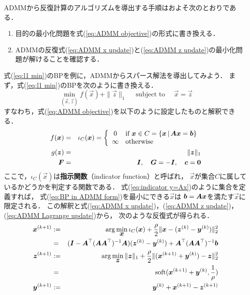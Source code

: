 ADMMから反復計算のアルゴリズムを導出する手順はおよそ次のとおりである．
\begin{enumerate}
\item 目的の最小化問題を式(\ref{eq:ADMM objective})の形式に書き換える．
\item ADMMの反復式(\ref{eq:ADMM x update})と(\ref{eq:ADMM z update})の最小化問題が解けることを確認する．
\end{enumerate}

式(\ref{eq:l1 min})のBPを例に，ADMMからスパース解法を導出してみよう．
まず，式(\ref{eq:l1 min})のBPを次のように書き換える．
\begin{equation}
 \min_{(\vec x,\vec z)} f(\vec x)+\|\vec z\|_1\quad\mbox{ subject to }\quad\vec x=\vec z
\label{eq:BP in ADMM form}
\end{equation}
すなわち，式(\ref{eq:ADMM objective})を以下のように設定したものと解釈できる．
\begin{eqnarray}
f(\mbox{\boldmath $x$})&=&\iota_C(\mbox{\boldmath $x$})=\left\{
\begin{array}{cl}
0 & \mbox{if $\mbox{\boldmath $x$}\in C=\{\mbox{\boldmath $x$}\,|\, \mbox{\boldmath $A$}\mbox{\boldmath $x$}=\mbox{\boldmath $b$}\}$}\\
\infty & \mbox{otherwise}
\end{array}
\right.\label{eq:indicator y=Ax}\\
g(\mbox{\boldmath $z$})&=&\|\mbox{\boldmath $z$}\|_1\label{eq:g for BP}\\
\mbox{\boldmath $F$}&=&\mbox{\boldmath $I$},\quad \mbox{\boldmath $G$}=-\mbox{\boldmath $I$},\quad \mbox{\boldmath $c$}=\mbox{\boldmath $0$}\label{eq:ADMM constants for BP}
\end{eqnarray}
ここで，$\iota_C(\vec x)$は{\bf 指示関数}（indicator function）と呼ばれ，
$\vec x$が集合$C$に属しているかどうかを判定する関数である．
式(\ref{eq:indicator y=Ax})のように集合を定義すれば，
式(\ref{eq:BP in ADMM form})を最小にできる$\vec x$は
$\mbox{\boldmath $b$}=\mbox{\boldmath $A$}\mbox{\boldmath $x$}$を満たす$\vec x$に限定される．
この解釈と式(\ref{eq:ADMM x update})，(\ref{eq:ADMM z update})，(\ref{eq:ADMM Lagrange update})から，
次のような反復式が得られる．
\begin{eqnarray}
\mbox{\boldmath $x$}^{(k+1)} &:= & \arg\min_{\mbox{\boldmath $x$}} \iota_C(\mbox{\boldmath $x$})+\frac{\rho}{2}\|\mbox{\boldmath $x$}-(\mbox{\boldmath $z$}^{(k)}-\mbox{\boldmath $y$}^{(k)})\|_2^2\label{eq:proximity y=Ax}\\
 &=& (\mbox{\boldmath $I$}-\mbox{\boldmath $A$}^\top(\mbox{\boldmath $A$}\mbox{\boldmath $A$}^\top)^{-1}\mbox{\boldmath $A$})(\mbox{\boldmath $z$}^{(k)}-\mbox{\boldmath $y$}^{(k)})+\mbox{\boldmath $A$}^\top(\mbox{\boldmath $A$}\mbox{\boldmath $A$}^\top)^{-1}\mbox{\boldmath $b$}\label{eq:projection onto y=Ax}\\
\mbox{\boldmath $z$}^{(k+1)} & := & \arg\min_{\mbox{\boldmath $z$}} \|\mbox{\boldmath $z$}\|_1+\frac{\rho}{2}\|(\mbox{\boldmath $x$}^{(k+1)}+\mbox{\boldmath $y$}^{(k)})-\mbox{\boldmath $z$}\|_2^2\label{eq:proximity l1 for BP}\\
&=&\mathop{\textrm{soft}}\nolimits(\mbox{\boldmath $x$}^{(k+1)}+\mbox{\boldmath $y$}^{(k)},\frac{1}{\rho})\label{eq:soft l1 for BP}\\
\mbox{\boldmath $y$}^{(k+1)}& := & \mbox{\boldmath $y$}^{(k)}+\mbox{\boldmath $x$}^{(k+1)}-\mbox{\boldmath $z$}^{(k+1)}
\end{eqnarray}
